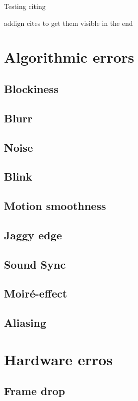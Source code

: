 

Testing citing ~\cite{4799375}

addign cites to get them visible in the end
~\cite{5464831}
~\cite{5583037}
~\cite{5583094}
~\cite{5710601}
~\cite{5739529}
~\cite{6081486}
~\cite{6116319}
~\cite{6411890}
~\cite{6467556}
~\cite{6625056}
~\cite{6705673}
~\cite{5605523}
~\cite{5290984}
~\cite{1203346}
~\cite{4803123}
~\cite{4799318}
~\cite{5381595}
~\cite{6229729}
~\cite{4347144}
~\cite{1247211}



\section{Algorithmic errors}
\subsection{Blockiness}
\subsection{Blurr}
\subsection{Noise}
\subsection{Blink}
\subsection{Motion smoothness}
\subsection{Jaggy edge}
\subsection{Sound Sync}
\subsection{Moir\'{e}-effect}
\subsection{Aliasing}
\section{Hardware  erros}
\subsection{Frame drop}
